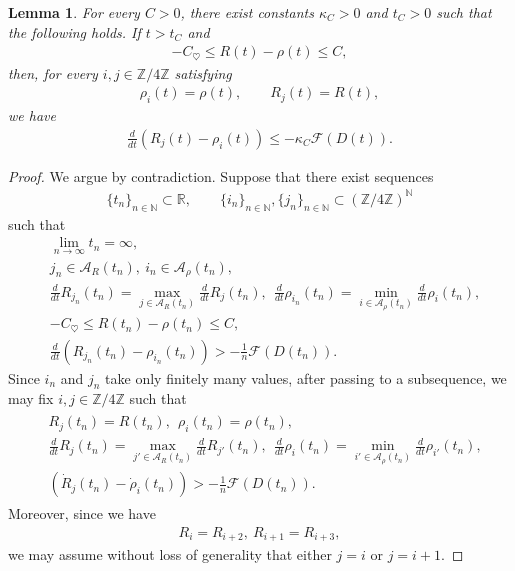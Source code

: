 \documentclass[10pt,a4paper]{amsart}
\newtheorem{lemma}[theorem]{Lemma}
\numberwithin{equation}{section}
\begin{document}
\begin{lemma}\label{|R|-rholem}
For every $C>0$, there exist constants $\kappa_C>0$ and $t_C>0$ such that the following holds. If $t>t_C$ and
\begin{align}\label{sameesass}
-C_{\heartsuit}
\leq R(t)-\rho(t)
\leq C,
\end{align}
then, for every $i,j\in\mathbb{Z}/4\mathbb{Z}$ satisfying
\begin{align*}
\rho_i(t)=\rho(t),
\qquad
R_j(t)=R(t),
\end{align*}
we have
\begin{align*}
\frac{d}{dt}\left(R_j(t)-\rho_i(t)\right)
\leq
-\kappa_C\mathcal{F}(D(t)).
\end{align*}
\end{lemma}
\begin{proof}
We argue by contradiction. Suppose that there exist sequences
\begin{align*}
\{t_n\}_{n\in\mathbb{N}}\subset\mathbb{R},
\qquad
\{i_n\}_{n\in\mathbb{N}},
\{j_n\}_{n\in\mathbb{N}}
\subset
\left(\mathbb{Z}/4\mathbb{Z}\right)^{\mathbb{N}}
\end{align*}
such that
\begin{align*}
&\lim_{n\to\infty}t_n=\infty,
\\
&j_n\in\mathcal{A}_R(t_n),\ i_n\in\mathcal{A}_{\rho}(t_n),
\\
&\frac{d}{dt}R_{j_n}(t_n)
=
\max_{j\in\mathcal{A}_R(t_n)}
\frac{d}{dt}R_j(t_n),\ \ \frac{d}{dt}\rho_{i_n}(t_n)
=
\min_{i\in\mathcal{A}_{\rho}(t_n)}
\frac{d}{dt}\rho_i(t_n),
\\
&-C_{\heartsuit}
\leq
R(t_n)-\rho(t_n)
\leq C,
\\
&\frac{d}{dt}
\left(R_{j_n}(t_n)-\rho_{i_n}(t_n)\right)
>
-\frac{1}{n}\mathcal{F}(D(t_n)).
\end{align*}
Since $i_n$ and $j_n$ take only finitely many values, after passing to a subsequence, we may fix $i,j\in\mathbb{Z}/4\mathbb{Z}$ such that
\begin{align}\label{rhoRlemsaishonokatei}
\begin{aligned}
&R_j(t_n)=R(t_n),\ \ \rho_i(t_n)=\rho(t_n),
\\
&\frac{d}{dt}R_j(t_n)
=
\max_{j'\in\mathcal{A}_R(t_n)}
\frac{d}{dt}R_{j'}(t_n),\ \ \frac{d}{dt}\rho_i(t_n)
=
\min_{i'\in\mathcal{A}_{\rho}(t_n)}
\frac{d}{dt}\rho_{i'}(t_n),
\\
&\left(\dot{R}_j(t_n)-\dot{\rho}_i(t_n)\right)
>
-\frac{1}{n}\mathcal{F}(D(t_n)).
\end{aligned}
\end{align}
Moreover, since we have
\begin{align*}
R_i=R_{i+2},\ R_{i+1}=R_{i+3},
\end{align*}
we may assume without loss of generality that either $j=i$ or $j=i+1$.


\end{proof}
\end{document}
